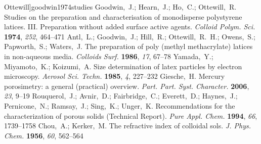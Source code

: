 \documentclass[journal=langd5,manuscript=article]{achemso}
\begin{document}
\begin{mcitethebibliography}{47}
  Ottewill]{goodwin1974studies}
Goodwin,~J.; Hearn,~J.; Ho,~C.; Ottewill,~R. Studies on the preparation and
  characterisation of monodisperse polystyrene latices. {III.} Preparation
  without added surface active agents. \emph{Colloid Polym. Sci.}
  \textbf{1974}, \emph{252}, 464--471\relax
\mciteBstWouldAddEndPuncttrue
\mciteSetBstMidEndSepPunct{\mcitedefaultmidpunct}
{\mcitedefaultendpunct}{\mcitedefaultseppunct}\relax
\EndOfBibitem
{}
Antl,~L.; Goodwin,~J.; Hill,~R.; Ottewill,~R.~H.; Owens,~S.; Papworth,~S.;
  Waters,~J. The preparation of poly (methyl methacrylate) latices in
  non-aqueous media. \emph{Colloids Surf.} \textbf{1986}, \emph{17},
  67--78\relax
\mciteBstWouldAddEndPuncttrue
\mciteSetBstMidEndSepPunct{\mcitedefaultmidpunct}
{\mcitedefaultendpunct}{\mcitedefaultseppunct}\relax
\EndOfBibitem
{}
Yamada,~Y.; Miyamoto,~K.; Koizumi,~A. Size determination of latex particles by
  electron microscopy. \emph{Aerosol Sci. Techn.} \textbf{1985}, \emph{4},
  227--232\relax
\mciteBstWouldAddEndPuncttrue
\mciteSetBstMidEndSepPunct{\mcitedefaultmidpunct}
{\mcitedefaultendpunct}{\mcitedefaultseppunct}\relax
\EndOfBibitem
{}
Giesche,~H. Mercury porosimetry: a general (practical) overview. \emph{Part.
  Part. Syst. Character.} \textbf{2006}, \emph{23}, 9--19\relax
\mciteBstWouldAddEndPuncttrue
\mciteSetBstMidEndSepPunct{\mcitedefaultmidpunct}
{\mcitedefaultendpunct}{\mcitedefaultseppunct}\relax
\EndOfBibitem
{}
Rouquerol,~J.; Avnir,~D.; Fairbridge,~C.; Everett,~D.; Haynes,~J.;
  Pernicone,~N.; Ramsay,~J.; Sing,~K.; Unger,~K. Recommendations for the
  characterization of porous solids (Technical Report). \emph{Pure Appl. Chem.}
  \textbf{1994}, \emph{66}, 1739--1758\relax
\mciteBstWouldAddEndPuncttrue
\mciteSetBstMidEndSepPunct{\mcitedefaultmidpunct}
{\mcitedefaultendpunct}{\mcitedefaultseppunct}\relax
\EndOfBibitem
{}
Chou,~A.; Kerker,~M. The refractive index of colloidal sols. \emph{J. Phys.
  Chem.} \textbf{1956}, \emph{60}, 562--564\relax
\mciteBstWouldAddEndPuncttrue
\mciteSetBstMidEndSepPunct{\mcitedefaultmidpunct}
{\mcitedefaultendpunct}{\mcitedefaultseppunct}\relax
\EndOfBibitem
{}

\end{mcitethebibliography}
\end{document}
